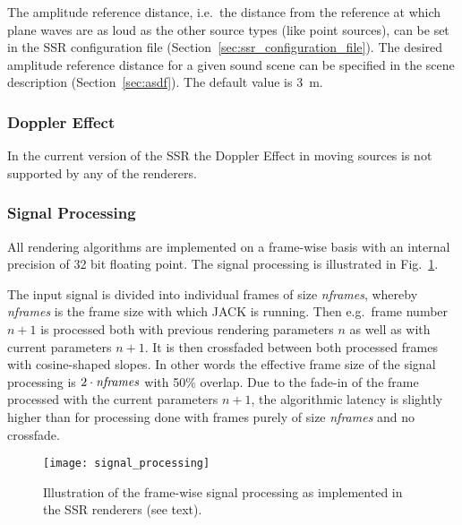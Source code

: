 The amplitude reference distance, i.e.~the distance from the reference at which
plane waves are as loud as the other source types (like point sources), can be
set in the SSR configuration file (Section~\ref{sec:ssr_configuration_file}).
The desired amplitude reference distance for a given sound scene can be
specified in the scene description (Section~\ref{sec:asdf}). The default value
is 3~m.

\subsubsection{Doppler Effect}

In the current version of the SSR the Doppler Effect in moving sources is not
supported by any of the renderers.

\subsubsection{Signal Processing}

All rendering algorithms are implemented on a frame-wise basis with an internal
precision of 32 bit floating point. The signal processing is illustrated in
Fig.~\ref{fig:signal_processing}.

The input signal is divided into individual frames of size \emph{nframes}, whereby
\emph{nframes} is the frame size with which JACK is running. Then e.g.\ frame number
$n+1$ is processed both with previous rendering parameters $n$ as well as with
current parameters $n+1$. It is then crossfaded between both processed frames
with cosine-shaped slopes. In other words the effective frame size of the
signal processing is $2\cdot\text{\emph{nframes}}$ with 50\% overlap. Due to the fade-in of
the frame processed with the current parameters $n+1$, the algorithmic latency
is slightly higher than for processing done with frames purely of size
\emph{nframes} and no crossfade.

\begin{figure}
\footnotesize {}   \psfrag{+}{\bf +}
 
 
 
  
\hfill
\texttt{[image: signal\_processing]}
\caption{\label{fig:signal_processing}{Illustration of the
frame-wise signal processing as implemented in the SSR renderers
(see text).}}
\end{figure}

